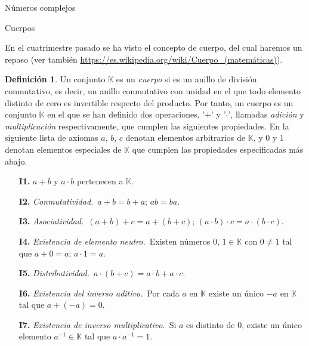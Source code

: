 \documentclass[a4paper,12pt,twoside,spanish,reqno]{amsbook}
\theoremstyle{definition}
\newtheorem{definicion}{Definici\'on}[section]
\theoremstyle{remark}
\newcommand{\K}{\mathbb K}
\begin{document}
\begin{chapter}{Números complejos}\label{chap-num-compl}
    
    \begin{section}{Cuerpos}
        
        En el cuatrimestre pasado se ha visto el concepto de cuerpo, del cual haremos un repaso (ver también  \href{https://es.wikipedia.org/wiki/Cuerpo\_(matemáticas)}{https://es.wikipedia.org/wiki/Cuerpo\_(matemáticas)}).
        
        
        \begin{definicion}
            Un  conjunto $\K$ es un \textit{cuerpo} si es un anillo de división conmutativo, es decir, un anillo conmutativo con unidad en el que todo elemento distinto de cero es invertible respecto del producto. Por tanto,  un cuerpo es un conjunto $\K$ en el que se han definido dos operaciones, '$+$' y '$\cdot$', llamadas \textit{adición} y \textit{multiplicación} respectivamente, que cumplen las siguientes propiedades. En la siguiente lista de axiomas $a$, $b$, $c$ denotan elementos arbitrarios de $\K$, y $0$ y $1$ denotan elementos especiales de $\K$ que cumplen las propiedades especificadas más abajo.
            \begin{enumerate}
                \item[{\bf I1.}] $a+b$ y $a\cdot b$ pertenecen a ${\K}$.
                \item[{\bf I2.}] {\em Conmutatividad.}\, $a+b = b+a$; $ab=ba$. 
                \item[{\bf I3.}] {\em Asociatividad.}\, $(a+b)+c = a+(b+c)$;\; $(a\cdot b)\cdot c = a\cdot (b\cdot c)$. 
                \item[{\bf I4.}] {\em Existencia de elemento neutro.}\, Existen números $0$, $1 \in \K$ con $0\not=1$ tal que $a+0=a$; $a\cdot 1=a$. 
                \item[{\bf I5.}] {\em Distributividad.}\, $a\cdot (b+c)=a\cdot b+a\cdot c$. 
                \item[{\bf I6.}] {\em Existencia del inverso aditivo.}\, Por cada $a$ en ${\K}$ existe un único  $-a$ en ${\K}$ tal que $a+(-a)=0$. 
                \item[{\bf I7.}] {\em Existencia de inverso multiplicativo.}\, Si $a$ es distinto de 0, existe un único elemento $a^{-1} \in \K$  tal que $a\cdot a^{-1}=1$. 
            \end{enumerate}
        \end{definicion}
        

\end{section}
\end{chapter}
\end{document}
